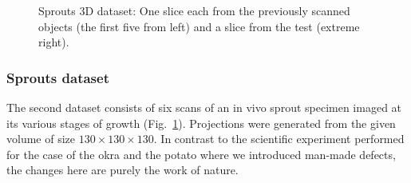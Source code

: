\documentclass[journal]{IEEEtran}
\begin{document}
\begin{figure}[!h]
\begin{subfigure}[b]{0.29\linewidth}
\captionsetup{labelformat=empty}
        \caption{}
     \end{subfigure}
      \caption{Sprouts 3D dataset: One slice each from the previously scanned objects (the first five from left) and a slice from the test (extreme
        right).}
\label{fig:object-prior_test_sprouts}
\addtolength{\textfloatsep}{-0.8cm}
\end{figure}
\subsubsection{\textbf{Sprouts dataset}}
\label{Sec:sprouts}
The second dataset consists of six scans of an in vivo
sprout specimen imaged at its various stages of growth
(Fig.~\ref{fig:object-prior_test_sprouts}). Projections were generated from the given volume of size $130\times130\times130$. In contrast to the scientific
experiment performed for the case of the okra and the potato where we
introduced man-made defects, the changes here are purely the work of
nature. %
\end{document}
